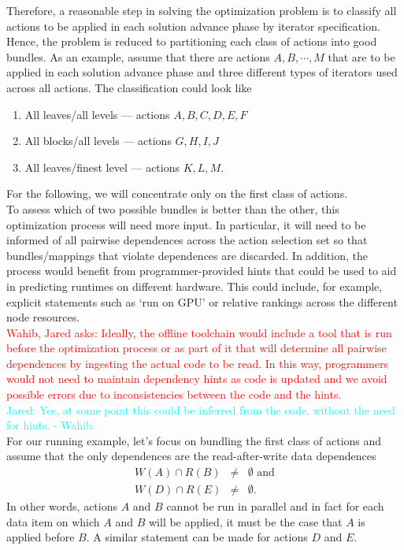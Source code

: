 \documentclass{article}
\newcommand{\JaredRfromW}[1]    {\textcolor{cyan}{Jared: #1 - Wahib.}}
\newcommand{\WahibQfromJO}[1]   {\textcolor{red}{Wahib, Jared asks: #1}}
\begin{document}
Therefore, a reasonable step in solving the optimization problem is to classify
all actions to be applied in each solution advance phase by iterator
specification.  Hence, the problem is reduced to partitioning each class of
actions into good bundles.  As an example, assume that there are actions $A, B,
\cdots, M$ that are to be applied in each solution advance phase and three
different types of iterators used across all actions.  The classification could
look like
\begin{enumerate}
\item{All leaves/all levels --- actions $A, B, C, D, E, F$}
\item{All blocks/all levels --- actions $G, H, I, J$}
\item{All leaves/finest level --- actions $K,L,M$}.
\end{enumerate}
For the following, we will concentrate only on the first class of actions.\\

To assess which of two possible bundles is better than the other, this
optimization process will need more input.  In particular, it will need to be
informed of all pairwise dependences across the action selection set so that
bundles/mappings that violate dependences are discarded.  In addition, the
process would benefit from programmer-provided hints that could be used to aid
in predicting runtimes on different hardware.  This could include, for example, explicit
statements such as `run on GPU' or relative rankings across the different node
resources.\\

\WahibQfromJO{Ideally, the offline toolchain would include a tool that is run before
the optimization process or as part of it that will determine all pairwise
dependences by ingesting the actual code to be read.  In this way, programmers
would not need to maintain dependency hints as code is updated and we avoid
possible errors due to inconsistencies between the code and the hints.}\\
\JaredRfromW{Yes, at some point this could be inferred from the code, without
the need for hints.}\\

For our running example, let's focus on bundling the first class of actions and
assume that the only dependences are the read-after-write data dependences
\begin{eqnarray*}
W(A) \cap R(B) & \not= & \emptyset\text{ and}\\
W(D) \cap R(E) & \not= & \emptyset.
\end{eqnarray*}
In other words, actions $A$ and $B$ cannot be run in parallel and in fact for each
data item on which $A$ and $B$ will be applied, it must be the case that $A$ is
applied before $B$.  A similar statement can be made for actions $D$ and $E$.\\
\end{document}

